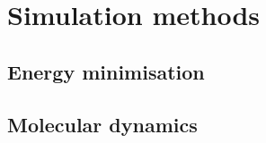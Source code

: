 \section{Simulation methods}
\label{sec:simulation}

\subsection{Energy minimisation}

\subsection{Molecular dynamics}
